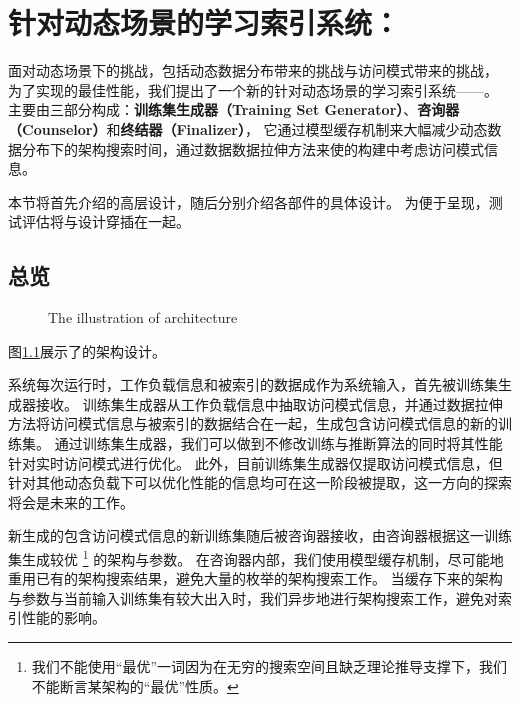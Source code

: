 \chapter{针对动态场景的学习索引系统：\sys}
\label{chap:sys}

面对动态场景下的挑战，包括动态数据分布带来的挑战与访问模式带来的挑战，
为了实现{\li}的最佳性能，我们提出了一个新的针对动态场景的学习索引系统{------}{\sys}。
{\sys}主要由三部分构成：\textbf{训练集生成器（Training Set Generator）}、\textbf{咨询器（Counselor）}和\textbf{终结器（Finalizer）}，
它通过模型缓存机制来大幅减少动态数据分布下的{\rmi}架构搜索时间，通过数据数据拉伸方法来使{\li}的构建中考虑访问模式信息。

本节将首先介绍{\sys}的高层设计，随后分别介绍{\sys}各部件的具体设计。
为便于呈现，测试评估将与设计穿插在一起。


\section{总览}

\begin{figure}[!htp]
  \centering
    {The illustration of \sys architecture}
  \label{fig:arch}
\end{figure}

图\ref{fig:arch}展示了{\sys}的架构设计。

系统每次运行时，工作负载信息和被索引的数据成作为系统输入，首先被训练集生成器接收。
训练集生成器从工作负载信息中抽取访问模式信息，并通过数据拉伸方法将访问模式信息与被索引的数据结合在一起，生成包含访问模式信息的新的训练集。
通过训练集生成器，我们可以做到不修改{\rmi}训练与推断算法的同时将其性能针对实时访问模式进行优化。
此外，目前训练集生成器仅提取访问模式信息，但针对其他动态负载下可以优化{\li}性能的信息均可在这一阶段被提取，这一方向的探索将会是未来的工作。

新生成的包含访问模式信息的新训练集随后被咨询器接收，由咨询器根据这一训练集生成较优
\footnote{我们不能使用``最优''一词因为在无穷的搜索空间且缺乏理论推导支撑下，我们不能断言某{\rmi}架构的``最优''性质。}
的{\rmi}架构与参数。
在咨询器内部，我们使用模型缓存机制，尽可能地重用已有的架构搜索结果，避免大量的枚举的架构搜索工作。
当缓存下来的{\rmi}架构与参数与当前输入训练集有较大出入时，我们异步地进行架构搜索工作，避免对索引性能的影响。

